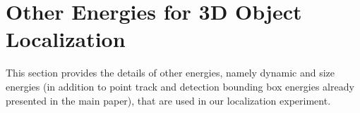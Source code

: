 \documentclass[10pt,twocolumn,letterpaper]{article}
\begin{document}
\begin{comment}
Note that if $u$ is a projection of $x$ to camera with intrinsic parameters
$K$, then $x = K^{-1}u$ where $u$ is in homgeneous coordinates. Hence the above equation can be re-written as
\newcommand{\Sproj}{\Sigma^{-1}_{\text{proj }i}}
\newcommand{\Sperpcut}{\Sigma^{-1}_{\text{perpcut }i}}
\begin{align}
  u^\top\Sproj u &= 0\enspace, 
\end{align}
where $\Sproj = K^{-\top}\Sperpcut K^{-1}$ and 
\begin{align}
  \Sperpcut = (I-\muic\np^\top)^\top\Sigmaicf(I-\muic\np^\top) - \np \np^\top \enspace.
\end{align}
If $u = [v^\top, 1]^\top$, $A = \Sproj(1:2, 1:2)$, $b = \Sproj(1:2, 3)$, $b^\top = \Sproj(3, 1:2)$ and $d = \Sproj(3,3)$ the equation can be expanded as
%
\begin{align}
[v^\top, 1]\begin{bmatrix} A & b\\ b^\top & d \end{bmatrix}[v^\top, 1]^\top &= 0\\
v^\top A v + 2 b^\top v + d &= 0
\end{align}
\begin{multline}
  v^\top A v + 2 b^\top A^{-\top} A v + b^\top A^{-\top} A A^{-1}b \\
  = b^\top A^{-\top} b - d
\end{multline}
\begin{multline}
  \left(v + A^{-1} b\right)^\top A \left( v + A^{-1} b\right) \\
  = b^\top A^{-\top}b - d
\end{multline}%
%
The mean and sigma of the projected ellipse can be computed by

%
\begin{align}
  \mu_{\text{2D}} &= A^{-1} b\\
  \Sigma^{-1}_{\text{2D}} &= \frac{1}{b^\top A^{-\top} b - d} A
\end{align}%
%
\end{comment}

\section{Other Energies for 3D Object Localization}
This section provides the details of other energies, namely dynamic and size energies (in addition to point track and detection bounding box energies already presented in the main paper), that are used in our localization experiment.
\end{document}
